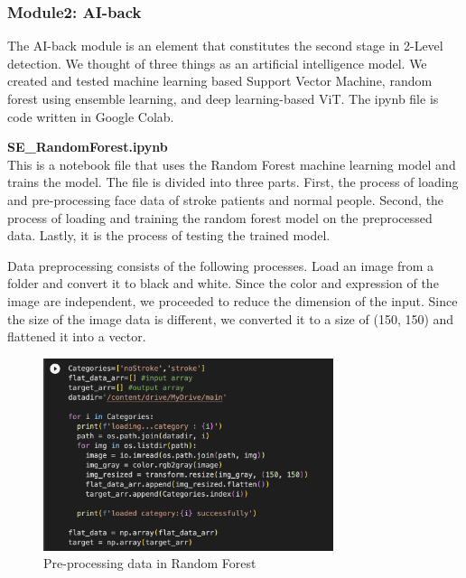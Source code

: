 \subsubsection{Module2: AI-back}
The AI-back module is an element that constitutes the second stage in 2-Level detection. We thought of three things as an artificial intelligence model. We created and tested machine learning based Support Vector Machine, random forest using ensemble learning, and deep learning-based ViT. The ipynb file is code written in Google Colab.

\textbf{SE\_RandomForest.ipynb} \\
This is a notebook file that uses the Random Forest machine learning model and trains the model. The file is divided into three parts. First, the process of loading and pre-processing face data of stroke patients and normal people. Second, the process of loading and training the random forest model on the preprocessed data. Lastly, it is the process of testing the trained model.

Data preprocessing consists of the following processes. Load an image from a folder and convert it to black and white. Since the color and expression of the image are independent, we proceeded to reduce the dimension of the input. Since the size of the image data is different, we converted it to a size of (150, 150) and flattened it into a vector.

\begin{figure}[h]
    \centering
    \includegraphics[width=8.5cm]{images/rf_data.png}
    \caption{Pre-processing data in Random Forest}
    \label{fig:enter-label}
\end{figure}


